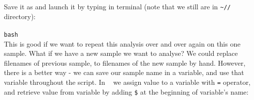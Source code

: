 \begin{samepage}

\end{samepage}
%
Save it as \texttt{\pipename} and launch it by typing in terminal (note that we still are in
\texttt{\textasciitilde/\workDir/\reseqDir} directory):\\~\\
\texttt{bash \pipename}\\

This is good if we want to repeat this analysis over and over again on this one sample.
What if we have a new sample we want to analyse? We could replace filenames of previous sample,
to filenames of the new sample by hand. However, there is a better way - we can save our
sample name in a variable, and use that variable throughout the script. In \bash~
we assign value to a variable with \texttt{=} operator, and retrieve value from variable
by adding \texttt{\$} at the beginning of variable's name:

